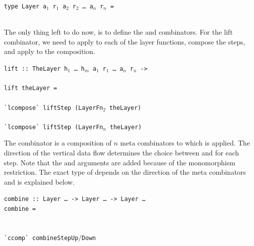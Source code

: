 \documentclass[preprint,natbib]{sigplanconf}
\begin{document}

\begin{small}
\begin{tabbing}
{\tt ty}\={\tt pe Layer a$_1$ r$_1$ a$_2$ r$_2$ \dots ~a$_n$ r$_n$ =}\\
        \\
\end{tabbing}
\end{small}



The only thing left to do now, is to define the  and  combinators. For the lift combinator, we need to apply  to each of the layer functions, compose the steps, and apply  to the composition. 

\begin{small}
\begin{tabbing}
{\tt lift}\verb| :: |\={\tt TheLayer h$_1$ \dots ~h$_m$ a$_1$ r$_1$ \dots ~a$_n$ r$_n$ ->}\\
                     \\
{\tt li}\={\tt ft t}\={\tt heLayer = }\\
\\
\>\verb|`lcompose` lift|{\tt Step (LayerFn$_2$ theLayer)}\\
\>{\tt \dots}\\ 
\>\verb|`lcompose` lift|{\tt Step (LayerFn$_n$ theLayer)}
\end{tabbing}
\end{small}%


The  combinator is a composition of $n$  meta combinators to which  is applied. The direction of the vertical data flow determines the choice between  and  for each step. \bc Note that the  and  arguments are added because of the monomorphism restriction. \ec The exact type of  depends on the direction of the meta combinators and is explained below. 
\pagebreak
\begin{small}
\begin{tabbing}
{\tt combine}\verb| :: |{\tt Layer \dots}\verb| -> |{\tt Layer \dots}\verb| -> |{\tt Layer \dots }\\
{\tt co}\={\tt mbine}\={\tt ~= }\\
\\
\>{\tt \dots}\\ 
\>\verb|`ccomp` combine|{\tt StepUp$/$Down}\\
\end{tabbing}%
\end{small}
\end{document}
